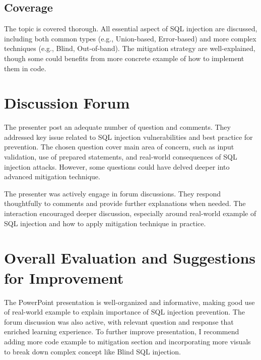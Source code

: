 \documentclass{article}
\begin{document}
\subsection{Coverage }
The topic is covered thorough. All essential aspect of SQL injection are discussed, including both common types (e.g., Union-based, Error-based) and more complex techniques (e.g., Blind, Out-of-band). The mitigation strategy are well-explained, though some could benefits from more concrete example of how to implement them in code.

\section{Discussion Forum  }
The presenter post an adequate number of question and comments. They addressed key issue related to SQL injection vulnerabilities and best practice for prevention. The chosen question cover main area of concern, such as input validation, use of prepared statements, and real-world consequences of SQL injection attacks. However, some questions could have delved deeper into advanced mitigation technique.

The presenter was actively engage in forum discussions. They respond thoughtfully to comments and provide further explanations when needed. The interaction encouraged deeper discussion, especially around real-world example of SQL injection and how to apply mitigation technique in practice.

\section{Overall Evaluation and Suggestions for Improvement}
The PowerPoint presentation is well-organized and informative, making good use of real-world example to explain importance of SQL injection prevention. The forum discussion was also active, with relevant question and response that enriched learning experience. To further improve presentation, I recommend adding more code example to mitigation section and incorporating more visuals to break down complex concept like Blind SQL injection.
\end{document}
